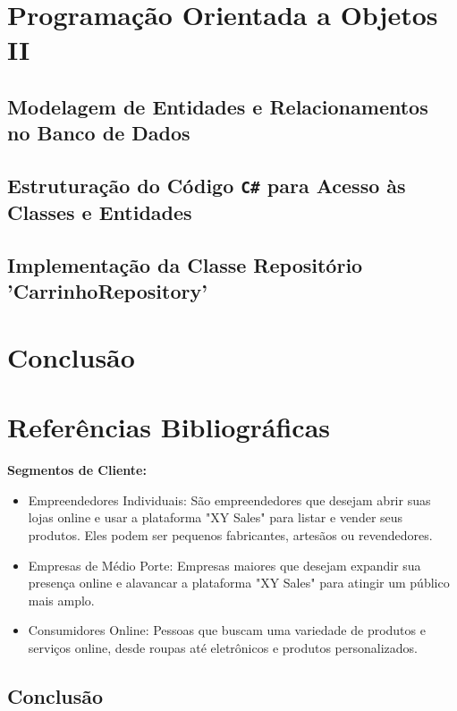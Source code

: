 \documentclass[
	12pt,				%
	openright,			%
	twoside,			%
	a4paper,			%
	english,			%
	brazil				%
	]{abntex2}
\begin{document}
\chapter{Programação Orientada a Objetos II}\label{cap_program_orientada_a_objetos}

\section{Modelagem de Entidades e Relacionamentos no Banco de Dados}

\section{Estruturação do Código \texttt{C\#} para Acesso às Classes e Entidades}

\section{Implementação da Classe Repositório 'CarrinhoRepository'}

\chapter{Conclusão}\label{cap_conclusao}

\chapter{Referências Bibliográficas}\label{cap_referencias}

\textbf{Segmentos de Cliente:}
\begin{itemize}
    \item Empreendedores Individuais: São empreendedores que desejam abrir suas lojas online e usar a plataforma "XY Sales" para listar e vender seus produtos. Eles podem ser pequenos fabricantes, artesãos ou revendedores.
    \item Empresas de Médio Porte: Empresas maiores que desejam expandir sua presença online e alavancar a plataforma "XY Sales" para atingir um público mais amplo.
    \item Consumidores Online: Pessoas que buscam uma variedade de produtos e serviços online, desde roupas até eletrônicos e produtos personalizados.
\end{itemize}

\section{Conclusão}
\end{document}
